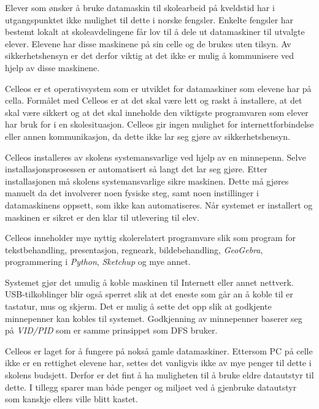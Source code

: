 Elever som \o nsker \aa{} bruke datamaskin til skolearbeid p\aa{} kveldstid har i utgangspunktet ikke mulighet til dette i norske fengsler. Enkelte fengsler har bestemt lokalt at skoleavdelingene f\aa r lov til \aa{} dele ut datamaskiner til utvalgte elever. Elevene har disse maskinene p\aa{} sin celle og de brukes uten tilsyn. Av sikkerhetshensyn er det derfor viktig at det ikke er mulig \aa{} kommunisere ved hjelp av disse maskinene.

Celleos er et operativsystem som er utviklet for datamaskiner som elevene har p\aa{} cella. Form\aa let med Celleos er at det skal v\ae re lett og raskt \aa{} installere, at det skal v\ae re sikkert og at det skal inneholde den viktigste programvaren som elever har bruk for i en skolesituasjon. Celleos gir ingen mulighet for internettforbindelse eller annen kommunikasjon, da dette ikke lar seg gj\o re av sikkerhetshensyn.


Celleos installeres av skolens systemansvarlige ved hjelp av en minnepenn. Selve installasjonsprosessen er automatisert s\aa{} langt det lar seg gj\o re. Etter installasjonen m\aa{} skolens systemansvarlige sikre maskinen. Dette m\aa{} gj\o res manuelt da det involverer noen fysiske steg, samt noen instillinger i datamaskinens oppsett, som ikke kan automatiseres. N\aa r systemet er installert og maskinen er sikret er den klar til utlevering til elev.

Celleos inneholder mye nyttig skolerelatert programvare slik som program for tekstbehandling, presentasjon, regneark, bildebehandling, {\it GeoGebra}, programmering i {\it Python}, {\it Sketchup} og mye annet.

Systemet gj\o r det umulig \aa{} koble maskinen til Internett eller annet nettverk. USB-tilkoblinger blir ogs\aa{} sperret slik at det eneste som g\aa r an \aa{} koble til er tastatur, mus og skjerm. Det er mulig \aa{} sette det opp slik at godkjente minnepenner kan kobles til systemet. Godkjenning av minnepenner baserer seg p\aa{} {\it VID/PID} som er samme prinsippet som DFS bruker.

Celleos er laget for \aa{} fungere p\aa{} noks\aa{} gamle datamaskiner. Ettersom PC p\aa{} celle ikke er en rettighet elevene har, settes det vanligvis ikke av mye penger til dette i skolens budsjett. Derfor er det fint \aa{} ha muligheten til \aa{} bruke eldre datautstyr til dette. I tillegg sparer man b\aa de penger og milj\o et ved \aa{} gjenbruke datautstyr som kanskje ellers ville blitt kastet.

